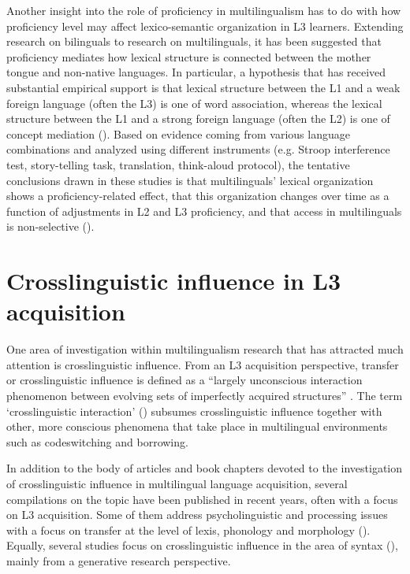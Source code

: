 \documentclass[output=paper,colorlinks,citecolor=brown,nonflat]{../langscibook}
\begin{document}
Another insight into the role of proficiency in multilingualism has to do with how proficiency level may affect lexico-semantic organization in L3 learners. Extending research on bilinguals to research on multilinguals, it has been suggested that proficiency mediates how lexical structure is connected between the mother tongue and non-native languages. In particular, a hypothesis that has received substantial empirical support is that lexical structure between the L1 and a weak foreign language (often the L3) is one of word association, whereas the lexical structure between the L1 and a strong foreign language (often the L2) is one of concept mediation (\citealt{Abunuwara1992, Schönpflug2000, Herwig2001, CenozEtAl2003}). Based on evidence coming from various language combinations and analyzed using different instruments (e.g. Stroop interference test, story-telling task, translation, think-aloud protocol), the tentative conclusions drawn in these studies is that multilinguals’ lexical organization shows a proficiency-related effect, that this organization changes over time as a function of adjustments in L2 and L3 proficiency, and that access in multilinguals is non-selective (\citealt{DijkstraVanHell2003}).

\section{Crosslinguistic influence in L3 acquisition}\label{sec:sanchez1:4}

One area of investigation within multilingualism research that has attracted much attention is crosslinguistic influence. From an L3 acquisition perspective, transfer or crosslinguistic influence is defined as a “largely unconscious interaction phenomenon between evolving sets of imperfectly acquired structures” \citep[143]{Bouvy2000}. The term ‘crosslinguistic interaction’ (\citealt{HerdinaJessner2002, Jessner2003}) subsumes crosslinguistic influence together with other, more conscious phenomena that take place in multilingual environments such as codeswitching and borrowing.

  In addition to the body of articles and book chapters devoted to the investigation of crosslinguistic influence in multilingual language acquisition, several compilations on the topic have been published in recent years, often with a focus on L3 acquisition. Some of them address psycholinguistic and processing issues with a focus on transfer at the level of lexis, phonology and morphology (\citealt{DeAngelisEtAl2015, Peukert2015}). Equally, several studies focus on crosslinguistic influence in the area of syntax (\citealt{Leung2009, CabrelliEtAl2012, AngelovskaHahn2017}), mainly from a generative research perspective.
\end{document}
